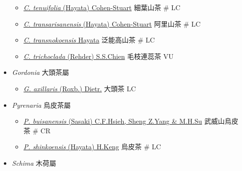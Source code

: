 \begin{itemize}
\begin{itemize}
        \item[] \href{http://www.theplantlist.org/tpl1.1/search?q=Camellia+tenuifolia}{\textit{C. tenuifolia} (Hayata) Cohen-Stuart}   細葉山茶  \# LC
        \item[] \href{http://www.theplantlist.org/tpl1.1/search?q=Camellia+transarisanensis}{\textit{C. transarisanensis} (Hayata) Cohen-Stuart}   阿里山茶  \# LC
        \item[] \href{http://www.theplantlist.org/tpl1.1/search?q=Camellia+transnokoensis}{\textit{C. transnokoensis} Hayata}   泛能高山茶  \# LC
        \item[] \href{http://www.theplantlist.org/tpl1.1/search?q=Camellia+trichoclada}{\textit{C. trichoclada} (Rehder) S.S.Chien}   毛枝連蕊茶   VU
  \end{itemize}
 \item[] \textit{Gordonia} 大頭茶屬
                                
  \begin{itemize}
        \item[] \href{http://www.theplantlist.org/tpl1.1/search?q=Gordonia+axillaris}{\textit{G. axillaris} (Roxb.) Dietr.}   大頭茶   LC
  \end{itemize}
 \item[] \textit{Pyrenaria} 烏皮茶屬
                                
  \begin{itemize}
        \item[] \href{http://www.theplantlist.org/tpl1.1/search?q=Pyrenaria+buisanensis}{\textit{P. buisanensis} (Sasaki) C.F.Hsieh, Sheng Z.Yang \& M.H.Su}   武威山烏皮茶  \# CR
        \item[] \href{http://www.theplantlist.org/tpl1.1/search?q=Pyrenaria+shinkoensis}{\textit{P. shinkoensis} (Hayata) H.Keng}   烏皮茶  \# LC
  \end{itemize}
 \item[] \textit{Schima} 木荷屬
                                

\end{itemize}
